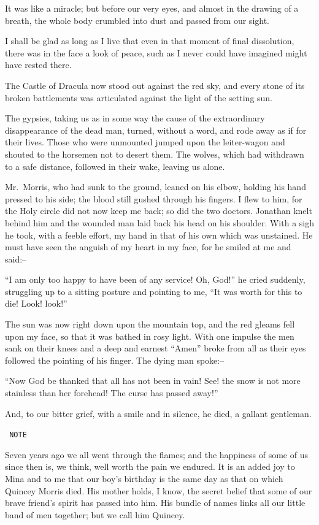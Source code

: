 \documentclass[12pt,openright]{book}
\begin{document}
It was like a miracle; but before our very eyes, and almost in the drawing of a breath, the whole body crumbled into dust and passed from our sight.

I shall be glad as long as I live that even in that moment of final dissolution, there was in the face a look of peace, such as I never could have imagined might have rested there.

The Castle of Dracula now stood out against the red sky, and every stone of its broken battlements was articulated against the light of the setting sun.

The gypsies, taking us as in some way the cause of the extraordinary disappearance of the dead man, turned, without a word, and rode away as if for their lives. Those who were unmounted jumped upon the leiter-wagon and shouted to the horsemen not to desert them. The wolves, which had withdrawn to a safe distance, followed in their wake, leaving us alone.

Mr. Morris, who had sunk to the ground, leaned on his elbow, holding his hand pressed to his side; the blood still gushed through his fingers. I flew to him, for the Holy circle did not now keep me back; so did the two doctors. Jonathan knelt behind him and the wounded man laid back his head on his shoulder. With a sigh he took, with a feeble effort, my hand in that of his own which was unstained. He must have seen the anguish of my heart in my face, for he smiled at me and said:–

“I am only too happy to have been of any service! Oh, God!” he cried suddenly, struggling up to a sitting posture and pointing to me, “It was worth for this to die! Look! look!”

The sun was now right down upon the mountain top, and the red gleams fell upon my face, so that it was bathed in rosy light. With one impulse the men sank on their knees and a deep and earnest “Amen” broke from all as their eyes followed the pointing of his finger. The dying man spoke:–

“Now God be thanked that all has not been in vain! See! the snow is not more stainless than her forehead! The curse has passed away!”

And, to our bitter grief, with a smile and in silence, he died, a gallant gentleman.

\texttt{                              NOTE}

Seven years ago we all went through the flames; and the happiness of some of us since then is, we think, well worth the pain we endured. It is an added joy to Mina and to me that our boy’s birthday is the same day as that on which Quincey Morris died. His mother holds, I know, the secret belief that some of our brave friend’s spirit has passed into him. His bundle of names links all our little band of men together; but we call him Quincey.
\end{document}

